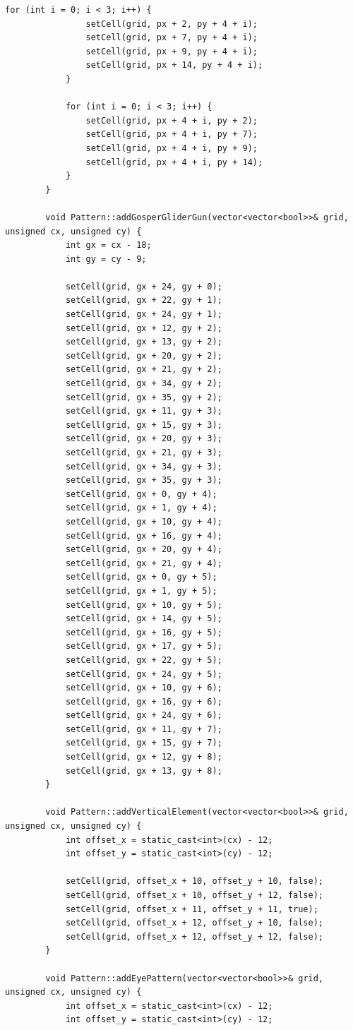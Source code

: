 \documentclass[14pt,a4paper]{extarticle}
\theoremstyle{plain}
\begin{document}
\begin{lstlisting}[title=pattern.cpp, gobble=16, breaklines=true, showspaces=false, showtabs=false, breakatwhitespace=true]
			for (int i = 0; i < 3; i++) {
				setCell(grid, px + 2, py + 4 + i);
				setCell(grid, px + 7, py + 4 + i);
				setCell(grid, px + 9, py + 4 + i);
				setCell(grid, px + 14, py + 4 + i);
			}
			
			for (int i = 0; i < 3; i++) {
				setCell(grid, px + 4 + i, py + 2);
				setCell(grid, px + 4 + i, py + 7);
				setCell(grid, px + 4 + i, py + 9);
				setCell(grid, px + 4 + i, py + 14);
			}
		}
		
		void Pattern::addGosperGliderGun(vector<vector<bool>>& grid, unsigned cx, unsigned cy) {
			int gx = cx - 18;
			int gy = cy - 9;
			
			setCell(grid, gx + 24, gy + 0);
			setCell(grid, gx + 22, gy + 1);
			setCell(grid, gx + 24, gy + 1);
			setCell(grid, gx + 12, gy + 2);
			setCell(grid, gx + 13, gy + 2);
			setCell(grid, gx + 20, gy + 2);
			setCell(grid, gx + 21, gy + 2);
			setCell(grid, gx + 34, gy + 2);
			setCell(grid, gx + 35, gy + 2);
			setCell(grid, gx + 11, gy + 3);
			setCell(grid, gx + 15, gy + 3);
			setCell(grid, gx + 20, gy + 3);
			setCell(grid, gx + 21, gy + 3);
			setCell(grid, gx + 34, gy + 3);
			setCell(grid, gx + 35, gy + 3);
			setCell(grid, gx + 0, gy + 4);
			setCell(grid, gx + 1, gy + 4);
			setCell(grid, gx + 10, gy + 4);
			setCell(grid, gx + 16, gy + 4);
			setCell(grid, gx + 20, gy + 4);
			setCell(grid, gx + 21, gy + 4);
			setCell(grid, gx + 0, gy + 5);
			setCell(grid, gx + 1, gy + 5);
			setCell(grid, gx + 10, gy + 5);
			setCell(grid, gx + 14, gy + 5);
			setCell(grid, gx + 16, gy + 5);
			setCell(grid, gx + 17, gy + 5);
			setCell(grid, gx + 22, gy + 5);
			setCell(grid, gx + 24, gy + 5);
			setCell(grid, gx + 10, gy + 6);
			setCell(grid, gx + 16, gy + 6);
			setCell(grid, gx + 24, gy + 6);
			setCell(grid, gx + 11, gy + 7);
			setCell(grid, gx + 15, gy + 7);
			setCell(grid, gx + 12, gy + 8);
			setCell(grid, gx + 13, gy + 8);
		}
		
		void Pattern::addVerticalElement(vector<vector<bool>>& grid, unsigned cx, unsigned cy) {
			int offset_x = static_cast<int>(cx) - 12;
			int offset_y = static_cast<int>(cy) - 12;
			
			setCell(grid, offset_x + 10, offset_y + 10, false);
			setCell(grid, offset_x + 10, offset_y + 12, false);
			setCell(grid, offset_x + 11, offset_y + 11, true);
			setCell(grid, offset_x + 12, offset_y + 10, false);
			setCell(grid, offset_x + 12, offset_y + 12, false);
		}
		
		void Pattern::addEyePattern(vector<vector<bool>>& grid, unsigned cx, unsigned cy) {
			int offset_x = static_cast<int>(cx) - 12;
			int offset_y = static_cast<int>(cy) - 12;
			

\end{lstlisting}
\end{document}
